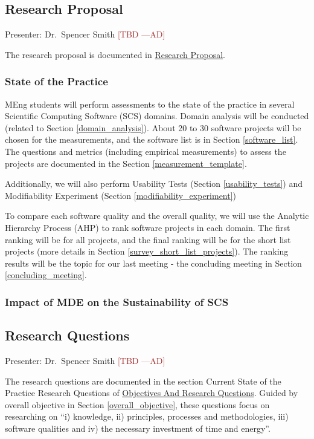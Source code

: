 \documentclass[12pt]{article}
\newcommand{\authornote}[3]{\textcolor{#1}{[#3 ---#2]}}
\newcommand{\authornote}[3]{}
\newcommand{\ad}[1]{\authornote{brown}{AD}{#1}} %
\begin{document}
\subsection{Research Proposal}
\label{research_proposal}
Presenter: Dr.\ Spencer Smith \ad{TBD}

The research proposal is documented in
\href{https://github.com/smiths/AIMSS/blob/master/OverallResearchProposal/ResearchProposal.pdf}{Research
Proposal}.

\subsubsection{State of the Practice}

MEng students will perform assessments to the state of the practice in several
Scientific Computing Software (SCS) domains. Domain analysis will be conducted
(related to Section \ref{domain_analysis}). About 20 to 30 software projects
will be chosen for the measurements, and the software list is in Section
\ref{software_list}. The questions and metrics (including empirical
measurements) to assess the projects are documented in the Section
\ref{measurement_template}.

Additionally, we will also perform Usability Tests (Section
\ref{usability_tests}) and Modifiability Experiment (Section
\ref{modifiability_experiment})

To compare each software quality and the overall quality, we will use the
Analytic Hierarchy Process (AHP) to rank software projects in each domain. The
first ranking will be for all projects, and the final ranking will be for the
short list projects (more details in Section \ref{survey_short_list_projects}).
The ranking results will be the topic for our last meeting - the concluding
meeting in Section \ref{concluding_meeting}.

\subsubsection{Impact of MDE on the Sustainability of SCS}

\subsection{Research Questions}
\label{research_questions}
Presenter: Dr.\ Spencer Smith \ad{TBD}

The research questions are documented in the section Current State of the
Practice Research Questions of
\href{https://github.com/smiths/AIMSS/blob/master/OverallResearchProposal/ObjectivesAndResearchQuestions.pdf}{Objectives
And Research Questions}. Guided by overall objective in Section
\ref{overall_objective}, these questions focus on researching on ``i) knowledge,
ii) principles, processes
and methodologies, iii) software qualities and iv) the necessary investment of
time and energy''.
\end{document}
